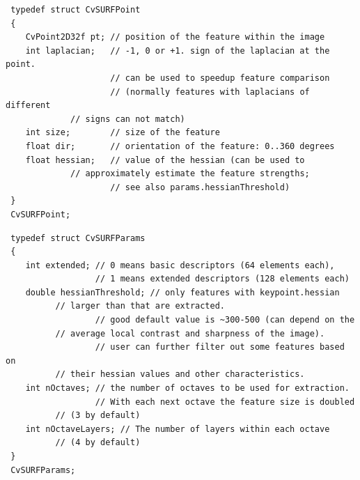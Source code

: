 \begin{description}
\ifC
{}
\begin{lstlisting}
 typedef struct CvSURFPoint
 {
    CvPoint2D32f pt; // position of the feature within the image
    int laplacian;   // -1, 0 or +1. sign of the laplacian at the point.
                     // can be used to speedup feature comparison
                     // (normally features with laplacians of different 
             // signs can not match)
    int size;        // size of the feature
    float dir;       // orientation of the feature: 0..360 degrees
    float hessian;   // value of the hessian (can be used to 
             // approximately estimate the feature strengths;
                     // see also params.hessianThreshold)
 }
 CvSURFPoint;
\end{lstlisting}
\else
{}
\fi
{}
\ifC
{}
\begin{lstlisting}
 typedef struct CvSURFParams
 {
    int extended; // 0 means basic descriptors (64 elements each),
                  // 1 means extended descriptors (128 elements each)
    double hessianThreshold; // only features with keypoint.hessian 
          // larger than that are extracted.
                  // good default value is ~300-500 (can depend on the 
          // average local contrast and sharpness of the image).
                  // user can further filter out some features based on 
          // their hessian values and other characteristics.
    int nOctaves; // the number of octaves to be used for extraction.
                  // With each next octave the feature size is doubled 
          // (3 by default)
    int nOctaveLayers; // The number of layers within each octave 
          // (4 by default)
 }
 CvSURFParams;


\end{lstlisting}
\end{description}
